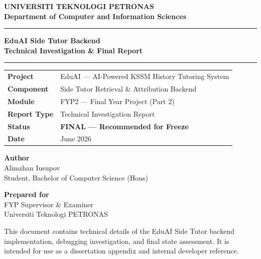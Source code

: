 \documentclass[12pt, a4paper]{report}
\begin{document}
\onehalfspacing

\begin{titlepage}
  \centering
  \vspace*{1.5cm}

  {\Large\bfseries UNIVERSITI TEKNOLOGI PETRONAS\\[0.3em]
   \large Department of Computer and Information Sciences}

  \vspace{1.5cm}
  \rule{\textwidth}{1pt}
  \vspace{0.4cm}

  {\LARGE\bfseries EduAI Side Tutor Backend\\[0.5em]
   \Large Technical Investigation \& Final Report}

  \vspace{0.4cm}
  \rule{\textwidth}{1pt}

  \vspace{1.2cm}

  \begin{tabular}{ll}
    \textbf{Project}    & EduAI — AI-Powered KSSM History Tutoring System \\[0.3em]
    \textbf{Component}  & Side Tutor Retrieval \& Attribution Backend \\[0.3em]
    \textbf{Module}     & FYP2 — Final Year Project (Part 2) \\[0.3em]
    \textbf{Report Type}& Technical Investigation Report \\[0.3em]
    \textbf{Status}     & \textbf{FINAL — Recommended for Freeze} \\[0.3em]
    \textbf{Date}       & June 2026 \\
  \end{tabular}

  \vspace{2.0cm}

  {\large\bfseries Author}\\[0.4em]
  {\large Alimzhan Iusupov}\\[0.2em]
  {\normalsize Student, Bachelor of Computer Science (Hons)}

  \vspace{1.5cm}

  {\large\bfseries Prepared for}\\[0.4em]
  FYP Supervisor \& Examiner\\[0.2em]
  Universiti Teknologi PETRONAS

  \vfill

  {\small This document contains technical details of the EduAI Side Tutor backend
   implementation, debugging investigation, and final state assessment.
   It is intended for use as a dissertation appendix and internal developer reference.}
\end{titlepage}
\end{document}
